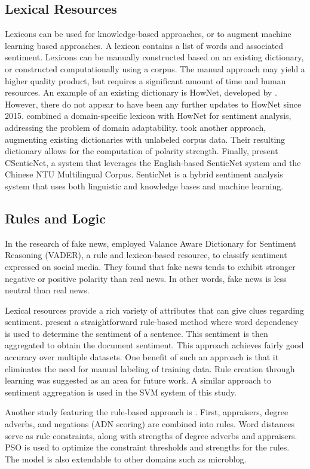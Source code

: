 \documentclass [11pt, proquest] {uwthesis}[2020/02/24]
\begin{document}
\subsection{Lexical Resources}  
Lexicons can be used for knowledge-based approaches, or to augment machine learning based approaches. A lexicon contains a list of words and associated sentiment. Lexicons can be manually constructed based on an existing dictionary, or constructed computationally using a corpus. The manual approach may yield a higher quality product, but requires a significant amount of time and human resources. An example of an existing dictionary is HowNet, developed by \cite{Dong2010}. However, there do not appear to have been any further updates to HowNet since 2015. \cite{Liu2013} combined a domain-specific lexicon with HowNet for sentiment analysis, addressing the problem of domain adaptability.
 \cite{Xu2010} took another approach, augmenting existing dictionaries with unlabeled corpus data. Their resulting dictionary allows for the computation of polarity strength. Finally, \cite{Peng2018} present CSenticNet, a system that leverages the English-based SenticNet system and the Chinese NTU Multilingual Corpus. SenticNet is a hybrid sentiment analysis system that uses both linguistic and knowledge bases and machine learning. 
\subsection{Rules and Logic}
In the research of fake news, \cite{Cui2019} employed Valance Aware Dictionary for Sentiment Reasoning (VADER), a rule and lexicon-based resource, to classify sentiment expressed on social media. They found that fake news tends to exhibit stronger negative or positive polarity than real news. In other words, fake news is less neutral than real news.

Lexical resources provide a rich variety of attributes that can give clues regarding sentiment. \cite{Zhang2009} present a straightforward rule-based method where word dependency is used to determine the sentiment of a sentence. This sentiment is then aggregated to obtain the document sentiment. This approach achieves fairly good accuracy over multiple datasets. One benefit of such an approach is that it eliminates the need for manual labeling of training data. Rule creation through learning was suggested as an area for future work. A similar approach to sentiment aggregation is used in the SVM system of this study.

Another study featuring the rule-based approach is \cite{Xiong2014}. First, appraisers, degree adverbs, and negations (ADN scoring) are combined into rules. Word distances serve as rule constraints, along with strengths of degree adverbs and appraisers. PSO is used to optimize the constraint thresholds and strengths for the rules. The model is also extendable to other domains such as microblog.
\end{document}
